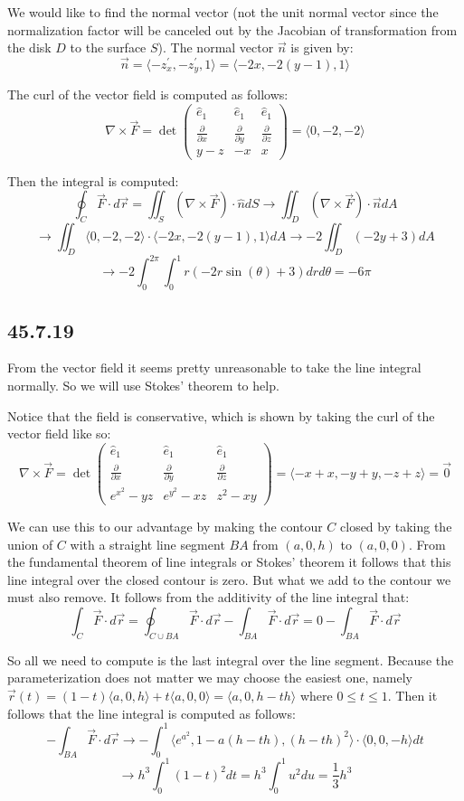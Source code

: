 \documentclass{article}
\begin{document}
We would like to find the normal vector (not the unit normal vector since the normalization factor will be canceled out by the Jacobian of transformation from the disk $D$ to the surface $S$). The normal vector $\vec{n}$ is given by:
$$\vec{n} = \langle -z^{\prime}_x, -z^{\prime}_y ,1 \rangle = \langle -2x,-2(y-1) ,1 \rangle$$

The curl of the vector field is computed as follows:
$$\nabla \times \vec{F} = \det \begin{pmatrix}
    \hat{e}_1 & \hat{e}_1 & \hat{e}_1 \\
    \frac{\partial}{\partial x} & \frac{\partial}{\partial y} & \frac{\partial}{\partial z} \\
    y-z & -x & x
\end{pmatrix} = \langle 0, -2 ,-2 \rangle$$

Then the integral is computed:
$$\oint_C \vec{F}\cdot d\vec{r} = \iint_S \left(\nabla\times\vec{F}\right)\cdot \hat{n}dS \to \iint_D \left(\nabla\times\vec{F}\right)\cdot \vec{n}dA $$
$$\to \iint_D \langle 0, -2 ,-2 \rangle\cdot \langle -2x,-2(y-1) ,1 \rangle dA \to -2\iint_D (-2y+3)dA$$
$$\to -2\int_0^{2\pi}\int_0^1 r(-2r\sin(\theta)+3)drd\theta = -6\pi$$

\subsection{45.7.19}

From the vector field it seems pretty unreasonable to take the line integral normally. So we will use Stokes' theorem to help.

Notice that the field is conservative, which is shown by taking the curl of the vector field like so:
$$\nabla \times \vec{F} = \det \begin{pmatrix}
    \hat{e}_1 & \hat{e}_1 & \hat{e}_1 \\
    \frac{\partial}{\partial x} & \frac{\partial}{\partial y} & \frac{\partial}{\partial z} \\
    e^{x^2}-yz & e^{y^2}-xz & z^2-xy
\end{pmatrix} = \langle -x+x, -y+y ,-z+z \rangle = \vec{0}$$

We can use this to our advantage by making the contour $C$ closed by taking the union of $C$ with a straight line segment $BA$ from $(a,0,h)$ to $(a,0,0)$. From the fundamental theorem of line integrals or Stokes' theorem it follows that this line integral over the closed contour is zero. But what we add to the contour we must also remove. It follows from the additivity of the line integral that:
$$\int_C \vec{F}\cdot d\vec{r} = \oint_{C\cup BA} \vec{F}\cdot d\vec{r} - \int_{BA} \vec{F}\cdot d\vec{r}  = 0-\int_{BA} \vec{F}\cdot d\vec{r}$$

So all we need to compute is the last integral over the line segment. Because the parameterization does not matter we may choose the easiest one, namely $\vec{r}(t) = (1-t)\langle a, 0 ,h \rangle + t\langle a, 0 ,0 \rangle = \langle a, 0, h-th\rangle$ where $0 \leq t \leq 1$. Then it follows that the line integral is computed as follows:
$$-\int_{BA} \vec{F}\cdot d\vec{r} \to -\int_0^1 \langle e^{a^2}, 1-a(h-th) ,(h-th)^2 \rangle \cdot \langle 0,0,-h\rangle dt$$
$$\to h^3\int_0^1 (1-t)^2dt = h^3\int_0^1 u^2 du = \frac{1}{3}h^3$$
\end{document}
